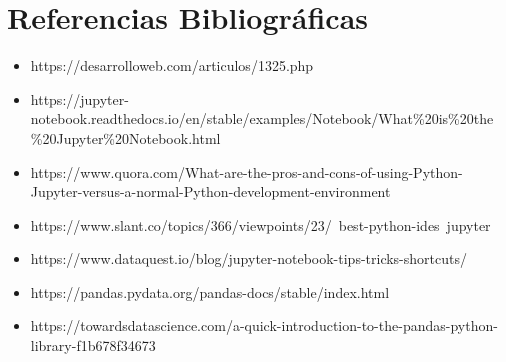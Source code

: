 \documentclass[a4paper]{article}
\begin{document}
\section{Referencias Bibliográficas}
\begin{itemize}
\item https://desarrolloweb.com/articulos/1325.php
\item https://jupyter-notebook.readthedocs.io/en/stable/examples/Notebook/What\%20is\%20the\\
\%20Jupyter\%20Notebook.html
\item https://www.quora.com/What-are-the-pros-and-cons-of-using-Python-Jupyter-versus-a-normal-Python-development-environment 
\item https://www.slant.co/topics/366/viewpoints/23/~best-python-ides~jupyter
\item https://www.dataquest.io/blog/jupyter-notebook-tips-tricks-shortcuts/
\item https://pandas.pydata.org/pandas-docs/stable/index.html
\item https://towardsdatascience.com/a-quick-introduction-to-the-pandas-python-library-f1b678f34673
\end{itemize}

%
\end{document}
